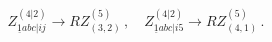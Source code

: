\begin{equation}
Z^{(4|2)}_{\underline{1}abc|ij} \rightarrow R Z^{(5)}_{(3,2)} \, , \quad 
Z^{(4|2)}_{\underline{1}abc|i5} \rightarrow R Z^{(5)}_{(4,1)} \, .
\end{equation}


